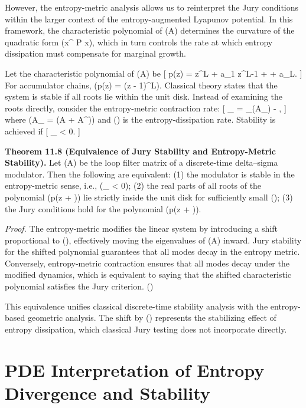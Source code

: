However, the entropy-metric analysis allows us to reinterpret the Jury conditions within the larger context of the entropy-augmented Lyapunov potential. In this framework, the characteristic polynomial of (A) determines the curvature of the quadratic form (x^{\top} P x), which in turn controls the rate at which entropy dissipation must compensate for marginal growth.

Let the characteristic polynomial of (A) be
[
p(z) = z^{L} + a_{1} z^{L-1} + \cdots + a_{L}.
]
For accumulator chains, (p(z) = (z - 1)^{L}). Classical theory states that the system is stable if all roots lie within the unit disk. Instead of examining the roots directly, consider the entropy-metric contraction rate:
[
\lambda_{} = \lambda_{}(A_{}) - \alpha \gamma,
]
where (A_{} = (A + A^{\top})) and (\gamma) is the entropy-dissipation rate. Stability is achieved if
[
\lambda_{} < 0.
]

\textbf{Theorem 11.8 (Equivalence of Jury Stability and Entropy-Metric Stability).}
Let (A) be the loop filter matrix of a discrete-time delta–sigma modulator. Then the following are equivalent:
(1) the modulator is stable in the entropy-metric sense, i.e., (\lambda_{} < 0);
(2) the real parts of all roots of the polynomial (p(z + \alpha \gamma)) lie strictly inside the unit disk for sufficiently small (\alpha);
(3) the Jury conditions hold for the polynomial (p(z + \alpha \gamma)).

\textit{Proof.}
The entropy-metric modifies the linear system by introducing a shift proportional to (\alpha \gamma), effectively moving the eigenvalues of (A) inward. Jury stability for the shifted polynomial guarantees that all modes decay in the entropy metric. Conversely, entropy-metric contraction ensures that all modes decay under the modified dynamics, which is equivalent to saying that the shifted characteristic polynomial satisfies the Jury criterion. \hfill(\square)

\medskip

This equivalence unifies classical discrete-time stability analysis with the entropy-based geometric analysis. The shift by (\alpha\gamma) represents the stabilizing effect of entropy dissipation, which classical Jury testing does not incorporate directly.

\bigskip

\section*{PDE Interpretation of Entropy Divergence and Stability}

